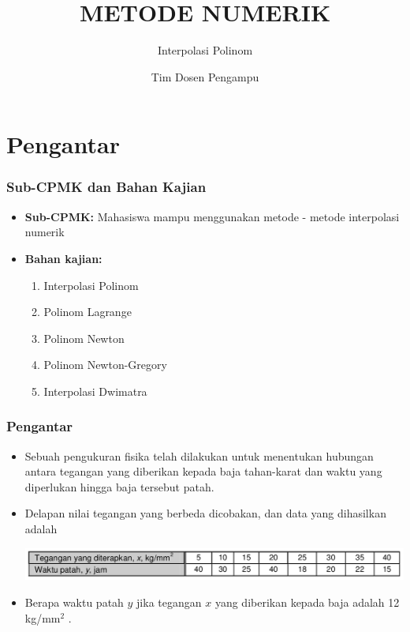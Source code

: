 \documentclass[pdflatex,compress,mathserif]{beamer}
\title{METODE NUMERIK}
\subtitle{Interpolasi Polinom}
\author{Tim Dosen Pengampu}
\begin{document}
\maketitle

\section{Pengantar}

\begin{frame}
	\frametitle{Sub-CPMK dan Bahan Kajian}
	\begin{itemize}
		\item \textbf{Sub-CPMK:} Mahasiswa mampu menggunakan metode - metode interpolasi numerik
		\item \textbf{Bahan kajian:}
		\begin{enumerate}
			\item Interpolasi Polinom
			\item Polinom Lagrange
			\item Polinom Newton
			\item Polinom Newton-Gregory
			\item Interpolasi Dwimatra
		\end{enumerate}
	\end{itemize}
\end{frame}

\begin{frame}
	\frametitle{Pengantar}
	\begin{itemize}
		\item Sebuah pengukuran fisika telah dilakukan untuk menentukan hubungan antara tegangan yang diberikan kepada baja tahan-karat dan waktu yang diperlukan hingga baja tersebut patah.
		\item Delapan nilai tegangan yang berbeda dicobakan, dan data yang dihasilkan adalah
		\begin{center}
			\includegraphics[width=\linewidth]{img/img01}
		\end{center}
		\item Berapa waktu patah $ y $ jika tegangan $ x $ yang diberikan kepada baja adalah 12 kg/mm$ ^2 $ .
	\end{itemize}
\end{frame}
\end{document}
